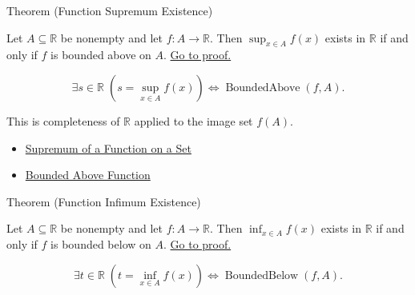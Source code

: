 \begin{theorembox}{Theorem (Function Supremum Existence)}
\begin{theorem}
\label{thm:function-supremum-existence}
Let \(A\subseteq\mathbb{R}\) be nonempty and let \(f:A\to\mathbb{R}\).
Then \(\sup_{x\in A} f(x)\) exists in \(\mathbb{R}\) if and only if \(f\)
is bounded above on \(A\).
\hyperref[prf:function-supremum-existence]{Go to proof.}
\end{theorem}
\end{theorembox}

\begin{remark*}
\[
  \exists s\in\mathbb{R}\;(s=\sup_{x\in A}f(x))
  \Longleftrightarrow
  \operatorname{BoundedAbove}(f,A).
\]
\end{remark*}

\begin{remark*}[Interpretation]
This is completeness of \(\mathbb{R}\) applied to the image set \(f(A)\).
\end{remark*}

\begin{dependencies}
\begin{itemize}
  \item \hyperref[def:function-supremum-on-set]{Supremum of a Function on a Set}
  \item \hyperref[def:function-bounded-above]{Bounded Above Function}
\end{itemize}
\end{dependencies}

\begin{theorembox}{Theorem (Function Infimum Existence)}
\begin{theorem}
\label{thm:function-infimum-existence}
Let \(A\subseteq\mathbb{R}\) be nonempty and let \(f:A\to\mathbb{R}\).
Then \(\inf_{x\in A} f(x)\) exists in \(\mathbb{R}\) if and only if \(f\)
is bounded below on \(A\).
\hyperref[prf:function-infimum-existence]{Go to proof.}
\end{theorem}
\end{theorembox}

\begin{remark*}
\[
  \exists t\in\mathbb{R}\;(t=\inf_{x\in A}f(x))
  \Longleftrightarrow
  \operatorname{BoundedBelow}(f,A).
\]
\end{remark*}

